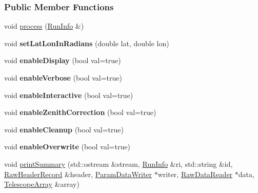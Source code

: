 \subsubsection*{Public Member Functions}
\begin{DoxyCompactItemize}
\item 
\hypertarget{classParameterizer_ab02d91aaed1db3a62a098d72fd64ea63}{
void \hyperlink{classParameterizer_ab02d91aaed1db3a62a098d72fd64ea63}{process} (\hyperlink{classRunInfo}{RunInfo} \&)}
\label{classParameterizer_ab02d91aaed1db3a62a098d72fd64ea63}

\item 
\hypertarget{classParameterizer_abb53e2c042e188dc22ef4021594a09e5}{
void {\bfseries setLatLonInRadians} (double lat, double lon)}
\label{classParameterizer_abb53e2c042e188dc22ef4021594a09e5}

\item 
\hypertarget{classParameterizer_a9f7704e035f18f73e137c5325dd5e4ca}{
void {\bfseries enableDisplay} (bool val=true)}
\label{classParameterizer_a9f7704e035f18f73e137c5325dd5e4ca}

\item 
\hypertarget{classParameterizer_a872359e61837365be13a236b139b9216}{
void {\bfseries enableVerbose} (bool val=true)}
\label{classParameterizer_a872359e61837365be13a236b139b9216}

\item 
\hypertarget{classParameterizer_a772dc0d2938a0253281b969a7fe0fde7}{
void {\bfseries enableInteractive} (bool val=true)}
\label{classParameterizer_a772dc0d2938a0253281b969a7fe0fde7}

\item 
\hypertarget{classParameterizer_a58cb48804c201ee9f21569aabebef4dc}{
void {\bfseries enableZenithCorrection} (bool val=true)}
\label{classParameterizer_a58cb48804c201ee9f21569aabebef4dc}

\item 
\hypertarget{classParameterizer_aa7997a98c56e52feee7c88d73aeec3c8}{
void {\bfseries enableCleanup} (bool val=true)}
\label{classParameterizer_aa7997a98c56e52feee7c88d73aeec3c8}

\item 
\hypertarget{classParameterizer_a05fe3ca6bc4897005a6b1b63a8c2ee7d}{
void {\bfseries enableOverwrite} (bool val=true)}
\label{classParameterizer_a05fe3ca6bc4897005a6b1b63a8c2ee7d}

\item 
\hypertarget{classParameterizer_a8416f32994c05ffcdf0c27c93ff0d34b}{
void \hyperlink{classParameterizer_a8416f32994c05ffcdf0c27c93ff0d34b}{printSummary} (std::ostream \&stream, \hyperlink{classRunInfo}{RunInfo} \&ri, std::string \&id, \hyperlink{structRawHeaderRecord}{RawHeaderRecord} \&header, \hyperlink{classParamDataWriter}{ParamDataWriter} $\ast$writer, \hyperlink{classRawDataReader}{RawDataReader} $\ast$data, \hyperlink{classTelescopeArray}{TelescopeArray} \&array)}
\label{classParameterizer_a8416f32994c05ffcdf0c27c93ff0d34b}

\end{DoxyCompactItemize}


